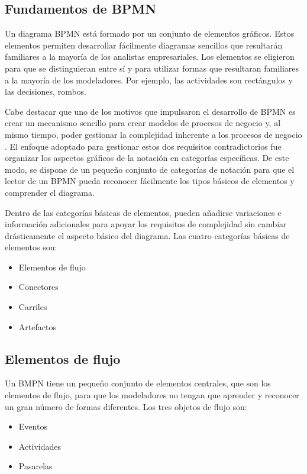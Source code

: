 \subsection{Fundamentos de BPMN}

Un diagrama BPMN está formado por un conjunto de elementos gráficos.
Estos elementos permiten desarrollar fácilmente diagramas sencillos que resultarán familiares a la mayoría de los analistas empresariales.
Los elementos se eligieron para que se distinguieran entre sí y para utilizar formas que resultaran familiares a la mayoría de los modeladores.
Por ejemplo, las actividades son rectángulos y las decisiones, rombos.

Cabe destacar que uno de los motivos que impulsaron el desarrollo de BPMN es crear un mecanismo sencillo para crear modelos de procesos de negocio y, al mismo tiempo, poder gestionar la complejidad inherente a los procesos de negocio \cite{white_introduction_2004}.
El enfoque adoptado para gestionar estos dos requisitos contradictorios fue organizar los aspectos gráficos de la notación en categorías específicas.
De este modo, se dispone de un pequeño conjunto de categorías de notación para que el lector de un BPMN pueda reconocer fácilmente los tipos básicos de elementos y comprender el diagrama.

Dentro de las categorías básicas de elementos, pueden añadirse variaciones e información adicionales para apoyar los requisitos de complejidad sin cambiar drásticamente el aspecto básico del diagrama.
Las cuatro categorías básicas de elementos son:

\begin{itemize}
    \item Elementos de flujo
    \item Conectores
    \item Carriles
    \item Artefactos
\end{itemize}

\subsection{Elementos de flujo}

Un BMPN tiene un pequeño conjunto de  elementos centrales, que son los elementos de flujo, para que los modeladores no tengan que aprender y reconocer un gran número de formas diferentes.
Los tres objetos de flujo son:

\begin{itemize}
    \item Eventos
    \item Actividades
    \item Pasarelas
\end{itemize}

